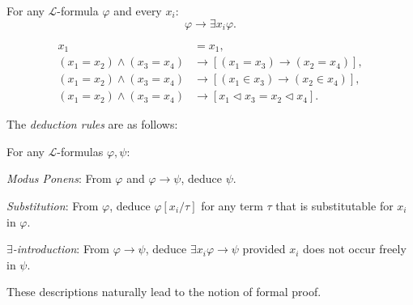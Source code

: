 \begin{definition}
    \label{def:Spec.Axiom}
    \leanok
    For any $\mathcal{L}$-formula $\varphi$ and every $x_i$:
    $$\varphi \rightarrow \exists x_i \varphi.$$
\end{definition}

\begin{definition}
    \label{def:Equality.Axioms}
    \leanok
    $$
    \begin{aligned}
        x_1 & = x_1, \\
        \left(x_1=x_2\right) \land \left(x_3=x_4\right) & 
        \rightarrow \left[\left(x_1=x_3\right) \rightarrow \left(x_2=x_4\right)\right], \\
        \left(x_1=x_2\right) \land \left(x_3=x_4\right) & 
        \rightarrow \left[\left(x_1 \in x_3\right) \rightarrow \left(x_2 \in x_4\right)\right], \\
        \left(x_1=x_2\right) \land \left(x_3=x_4\right) & 
        \rightarrow \left[x_1 \lhd x_3 = x_2 \lhd x_4 \right]. 
    \end{aligned}
    $$
\end{definition}

The \textit{deduction rules} are as follows:

\begin{definition}
    \label{def:prf.MP+prf.Subst+prf.ExIntro}
    For any $\mathcal{L}$-formulas $\varphi, \psi$:
    \begin{description}
        \item \textit{Modus Ponens}: 
        From $\varphi$ and $\varphi \rightarrow \psi$, deduce $\psi$.
        \item \textit{Substitution}:
        From $\varphi$, deduce $\varphi[x_i/\tau]$ for any term $\tau$ that is substitutable for
        $x_i$ in $\varphi$.
        \item \textit{$\exists$-introduction}:
        From $\varphi \rightarrow \psi$, deduce $\exists x_i \varphi \rightarrow \psi$ provided
        $x_i$ does not occur freely in $\psi$.
    \end{description}
\end{definition}

These descriptions naturally lead to the notion of formal proof.

